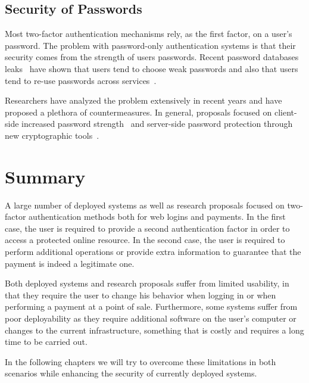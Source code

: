 \subsection{Security of Passwords}

Most two-factor authentication mechanisms rely, as the first factor, on a user's password. The problem with password-only authentication systems is that their security comes from the strength of users passwords. Recent password databases leaks~\cite{evernotehack,yahoohack,linkedinhack} have shown that users tend to choose weak passwords and also that users tend to re-use passwords across services~\cite{passwordreuse}.

Researchers have analyzed the problem extensively in recent years and have proposed a plethora of countermeasures. In general, proposals focused on client-side increased password strength~\cite{passhash,vaultwww,passpet,passwordsstrenghts} and server-side password protection through new cryptographic tools~\cite{honeycomb,honeysp}.

\section{Summary}

A large number of deployed systems as well as research proposals focused on two-factor authentication methods both for web logins and payments. In the first case, the user is required to provide a second authentication factor in order to access a protected online resource. In the second case, the user is required to perform additional operations or provide extra information to guarantee that the payment is indeed a legitimate one.

Both deployed systems and research proposals suffer from limited usability, in that they require the user to change his behavior when logging in or when performing a payment at a point of sale. Furthermore, some systems suffer from poor deployability as they require additional software on the user's computer or changes to the current infrastructure, something that is costly and requires a long time to be carried out.

In the following chapters we will try to overcome these limitations in both scenarios while enhancing the security of currently deployed systems.